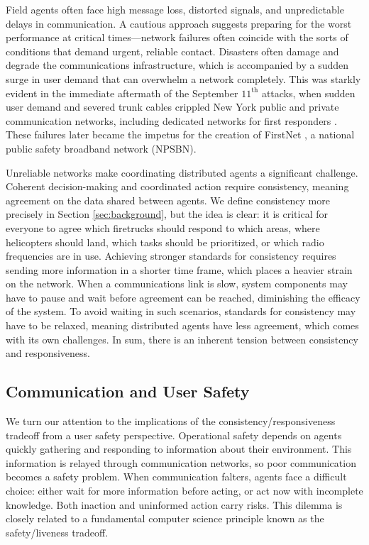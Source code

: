 \documentclass[]             %
{NASA}                       %
\theoremstyle{definition}
\begin{document}
Field agents often face high message loss, distorted signals, and
unpredictable delays in communication. A cautious approach suggests
preparing for the worst performance at critical times---network
failures often coincide with the sorts of conditions that demand
urgent, reliable contact. Disasters often damage and degrade the
communications infrastructure, which is accompanied by a sudden surge
in user demand that can overwhelm a network completely. This was
starkly evident in the immediate aftermath of the September
$11^\textrm{th}$ attacks, when sudden user demand and severed trunk
cables crippled New York public and private communication networks,
including dedicated networks for first responders
\cite{2011:Reardon}. These failures later became the impetus for the
creation of FirstNet \cite{2021:firstnet, 2021:firstnet2}, a national
public safety broadband network (NPSBN).

Unreliable networks make coordinating distributed agents a significant
challenge. Coherent decision-making and coordinated action require
consistency, meaning agreement on the data shared between agents. We
define consistency more precisely in Section \ref{sec:background}, but
the idea is clear: it is critical for everyone to agree which
firetrucks should respond to which areas, where helicopters should
land, which tasks should be prioritized, or which radio frequencies
are in use. Achieving stronger standards for consistency requires
sending more information in a shorter time frame, which places a
heavier strain on the network. When a communications link is slow,
system components may have to pause and wait before agreement can be
reached, diminishing the efficacy of the system. To avoid waiting in
such scenarios, standards for consistency may have to be relaxed,
meaning distributed agents have less agreement, which comes with its
own challenges. In sum, there is an inherent tension between
consistency and responsiveness.

\subsection{Communication and User Safety}
\label{ssec:communication-and-safety}
We turn our attention to the implications of the
consistency/responsiveness tradeoff from a user safety
perspective. Operational safety depends on agents quickly gathering
and responding to information about their environment. This
information is relayed through communication networks, so poor
communication becomes a safety problem. When communication falters,
agents face a difficult choice: either wait for more information
before acting, or act now with incomplete knowledge. Both inaction and
uninformed action carry risks. This dilemma is closely related to a
fundamental computer science principle known as the safety/liveness
tradeoff.
\end{document}
